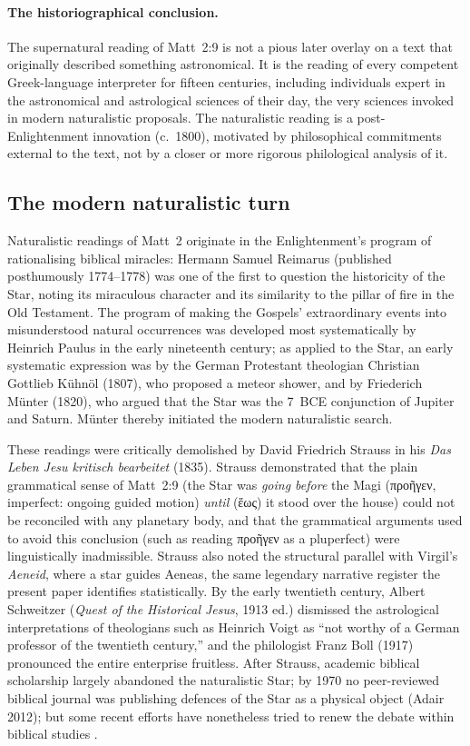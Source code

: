\documentclass[11pt,a4paper]{article}
\newcommand{\grk}[1]{{\fontencoding{LGR}\selectfont #1}}
\newcommand{\grk}[1]{{\greekfont #1}}
\begin{document}
\paragraph{The historiographical conclusion.}
The supernatural reading of Matt~2:9 is not a pious later overlay on a text that originally
described something astronomical. It is the reading of every competent Greek-language
interpreter for fifteen centuries, including individuals expert in the astronomical and
astrological sciences of their day, the very sciences invoked in modern naturalistic
proposals. The naturalistic reading is a post-Enlightenment innovation (c.~1800),
motivated by philosophical commitments external to the text, not by a closer or more
rigorous philological analysis of it.

\subsection{The modern naturalistic turn}

Naturalistic readings of Matt~2 originate in the Enlightenment's program of rationalising
biblical miracles: Hermann Samuel Reimarus (published posthumously 1774--1778) was one of the first
to question the historicity of the Star, noting its miraculous character and its similarity
to the pillar of fire in the Old Testament. The program of making the Gospels' extraordinary
events into misunderstood natural occurrences was developed most systematically by Heinrich
Paulus in the early nineteenth century; as applied to the Star, an early systematic
expression was by the German Protestant theologian Christian Gottlieb K\"{u}hn\"{o}l (1807),
who proposed a meteor shower, and by Friederich M\"{u}nter (1820), who argued that the Star
was the 7~BCE conjunction of Jupiter and Saturn. M\"{u}nter thereby initiated the modern
naturalistic search.

These readings were critically demolished by David Friedrich Strauss in his
\textit{Das Leben Jesu kritisch bearbeitet} (1835)\cite{strauss1835}. Strauss demonstrated
that the plain grammatical sense of Matt~2:9 (the Star was \emph{going before} the Magi
(\grk{προῆγεν}, imperfect: ongoing guided motion) \emph{until} (\grk{ἕως}) it stood over
the house) could not be reconciled with any planetary body, and that the grammatical arguments
used to avoid this conclusion (such as reading \grk{προῆγεν} as a pluperfect) were linguistically
inadmissible. Strauss also noted the structural parallel with Virgil's \textit{Aeneid},
where a star guides Aeneas, the same legendary narrative register the present paper identifies
statistically. By the early twentieth century, Albert Schweitzer (\textit{Quest of the
Historical Jesus}, 1913 ed.) dismissed the astrological interpretations of theologians such
as Heinrich Voigt as ``not worthy of a German professor of the twentieth century,'' and the
philologist Franz Boll (1917)\cite{boll1917} pronounced the entire enterprise fruitless.
After Strauss, academic biblical scholarship largely abandoned the naturalistic Star;
by 1970 no peer-reviewed biblical journal was publishing defences of the Star as a physical
object (Adair 2012); but some recent efforts have nonetheless tried to renew the debate 
within biblical studies \cite{barthel2015}.
\end{document}
